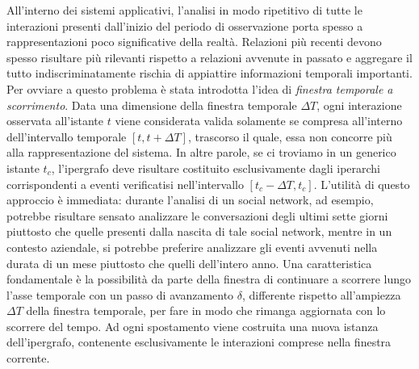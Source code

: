 All'interno dei sistemi applicativi, l'analisi in modo ripetitivo di tutte le interazioni presenti dall'inizio del periodo di osservazione porta spesso a rappresentazioni poco significative della realtà.
Relazioni più recenti devono spesso risultare più rilevanti rispetto a relazioni avvenute in passato e aggregare il tutto indiscriminatamente rischia di appiattire informazioni temporali importanti.
Per ovviare a questo problema è stata introdotta l'idea di \textit{finestra temporale a scorrimento}.
Data una dimensione della finestra temporale $\Delta T$, ogni interazione osservata all'istante $t$ viene considerata valida solamente se compresa all'interno dell'intervallo temporale $[t, t + \Delta T]$, trascorso il quale, essa non concorre più alla rappresentazione del sistema.
In altre parole, se ci troviamo in un generico istante $t_c$, l'ipergrafo deve risultare costituito esclusivamente dagli iperarchi corrispondenti a eventi verificatisi nell'intervallo $[t_c - \Delta T, t_c]$.
L'utilità di questo approccio è immediata: durante l'analisi di un social network, ad esempio, potrebbe risultare sensato analizzare le conversazioni degli ultimi sette giorni piuttosto che quelle presenti dalla nascita di tale social network, mentre in un contesto aziendale, si potrebbe preferire analizzare gli eventi avvenuti nella durata di un mese piuttosto che quelli dell'intero anno.
Una caratteristica fondamentale è la possibilità da parte della finestra di continuare a scorrere lungo l'asse temporale con un passo di avanzamento $\delta$, differente rispetto all'ampiezza $\Delta T$ della finestra temporale, per fare in modo che rimanga aggiornata con lo scorrere del tempo.
Ad ogni spostamento viene costruita una nuova istanza dell'ipergrafo, contenente esclusivamente le interazioni comprese nella finestra corrente.